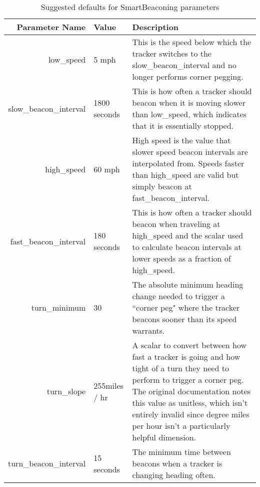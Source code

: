 \begin{table}
	\centering
	\begin{tabular}{|r|l|p{8cm}|}
		\hline
		Parameter Name & Value & Description \\ \hline
		low\_speed & 5 mph & This is the speed below which the tracker
		switches to the slow\_beacon\_interval 
		and no longer performs corner pegging. \\ \hline
		slow\_beacon\_interval & 1800 seconds & This is how often a tracker
		should beacon when it is moving slower than low\_speed, which indicates
		that it is essentially stopped. \\ \hline
		high\_speed & 60 mph & High speed is the value that slower speed
		beacon intervals are interpolated from. Speeds faster than high\_speed
		are valid but simply beacon at fast\_beacon\_interval. \\ \hline
		fast\_beacon\_interval & 180 seconds & This is how often a tracker should
		beacon when traveling at high\_speed and the scalar used to 
		calculate beacon intervals at lower speeds as a fraction of high\_speed. \\ \hline
		turn\_minimum & 30\textdegree & The absolute minimum heading change needed 
		to trigger
		a ``corner peg" where the tracker beacons sooner than its speed warrants. \\ \hline
		turn\_slope & 255\textdegree miles / hr &
		A scalar to convert between how fast a tracker is going and 
		how tight of a turn they need to perform to trigger a corner peg.
		The original documentation notes this value as unitless,
		which isn't entirely invalid since degree miles per hour isn't 
		a particularly helpful dimension. \\ \hline
		turn\_beacon\_interval & 15 seconds & The minimum time between beacons 
		when a tracker is changing heading often. \\ \hline

	\end{tabular}
	\caption{Suggested defaults for SmartBeaconing parameters}
	\label{tab:smartbeaconparams}
\end{table}

